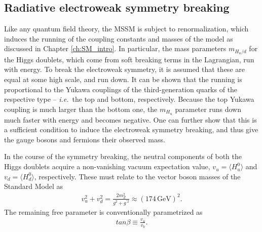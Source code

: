 \documentclass[twoside,english]{uiofysmaster}
\begin{document}
\subsection{Radiative electroweak symmetry breaking}
Like any quantum field theory, the MSSM is subject to renormalization, which induces the running of the coupling constants and masses of the model as discussed in Chapter \ref{ch:SM_intro}. In particular, the mass parameters $m_{H_u/d}$ for the Higgs doublets, which come from soft breaking terms in the Lagrangian, run with energy. To break the electroweak symmetry, it is assumed that these are equal at some high scale, and run down. It can be shown that the running is proportional to the Yukawa couplings of the third-generation quarks of the respective type -- {\it i.e.}\ the top and bottom, respectively. Because the top Yukawa coupling is much larger than the bottom one, the $m_{H_u}$ parameter runs down much faster with energy and becomes negative. One can further show that this is a sufficient condition to induce the electroweak symmetry breaking, and thus give the gauge bosons and fermions their observed mass. 

In the course of the symmetry breaking, the neutral components of both the Higgs doublets acquire a non-vanishing vacuum expectation value, $v_u = \langle H_u^0 \rangle$ and $v_d = \langle H_d^0 \rangle$, respectively. These must relate to the vector boson masses of the Standard Model as
\begin{align}
	v_u^2 + v_d^2 = \frac{2m_Z^2}{g^2 + g^{'2}} \approx (174 \,\mathrm{GeV})^2.
\end{align}
The remaining free parameter is conventionally parametrized as
\begin{align}
	tan \beta \equiv \frac{v_u}{v_b}.
\end{align}
\end{document}
